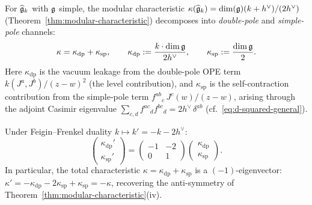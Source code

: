 \begin{definition}\label{def:channel-decomposition}
For $\widehat{\mathfrak{g}}_k$ with $\mathfrak{g}$ simple, the modular
characteristic $\kappa(\widehat{\mathfrak{g}}_k) =
\dim(\mathfrak{g})(k + h^\vee)/(2h^\vee)$
(Theorem~\ref{thm:modular-characteristic}) decomposes into
\emph{double-pole} and \emph{simple-pole} channels:
\begin{equation}\label{eq:kappa-dp-sp}
\kappa = \kappa_{\mathrm{dp}} + \kappa_{\mathrm{sp}},
\qquad
\kappa_{\mathrm{dp}}
:= \frac{k \cdot \dim\mathfrak{g}}{2h^\vee},
\qquad
\kappa_{\mathrm{sp}}
:= \frac{\dim\mathfrak{g}}{2}.
\end{equation}
Here $\kappa_{\mathrm{dp}}$ is the vacuum leakage from the
double-pole OPE term $k(J^a, J^b)/(z-w)^2$ (the level
contribution), and $\kappa_{\mathrm{sp}}$ is the self-contraction
contribution from the simple-pole term
$f^{ab}{}_{c}\,J^c(w)/(z-w)$, arising through the adjoint
Casimir eigenvalue
$\sum_{c,d} f^{ac}{}_d f^{bc}{}_d = 2h^\vee\,\delta^{ab}$
(cf.~\eqref{eq:d-squared-general}).
\end{definition}

\begin{proposition}
\label{prop:ff-channel-shear}
Under Feigin--Frenkel duality $k \mapsto k' = -k - 2h^\vee$:
\begin{equation}\label{eq:ff-shear}
\begin{pmatrix} \kappa_{\mathrm{dp}}' \\
\kappa_{\mathrm{sp}}' \end{pmatrix}
=
\begin{pmatrix} -1 & -2 \\ 0 & 1 \end{pmatrix}
\begin{pmatrix} \kappa_{\mathrm{dp}} \\
\kappa_{\mathrm{sp}} \end{pmatrix}.
\end{equation}
In particular, the total characteristic
$\kappa = \kappa_{\mathrm{dp}} + \kappa_{\mathrm{sp}}$
is a $(-1)$-eigenvector:
$\kappa' = -\kappa_{\mathrm{dp}} - 2\kappa_{\mathrm{sp}}
+ \kappa_{\mathrm{sp}} = -\kappa$,
recovering the anti-symmetry of
Theorem~\textup{\ref{thm:modular-characteristic}}(iv).
\end{proposition}

